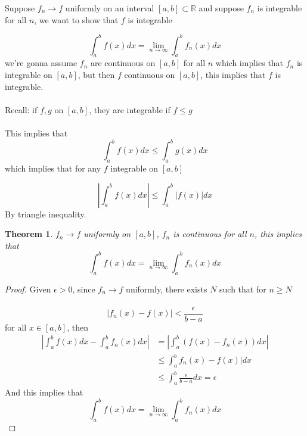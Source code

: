\documentclass[12pt]{article}
\theoremstyle{plain}
\newtheorem{theorem}{Theorem}[section]
\theoremstyle{definition}
\begin{document}
Suppose $f_n \to f$ uniformly on an interval $[a,b]\subset\mathbb{R}$ and suppose $f_n$ is integrable for all $n$, we want to show that $f$ is integrable

$$\int^b_a f(x) dx = \lim_{n\to\infty} \int^b_a f_n (x) dx$$
we're gonna assume $f_n$ are continuous on $[a,b]$ for all $n$ which implies that $f_n$ is integrable on $[a,b]$, but then $f$ continuous on $[a,b]$, this implies that $f$ is integrable.
\\
\\
Recall: if $f,g$ on $[a,b]$, they are integrable if $f \leq g$\\
\\
This implies that
$$\int^b_a f(x) dx \leq \int^b_a g(x) dx$$
which implies that for any $f$ integrable on $[a,b]$

$$|\int^b_a f(x) dx| \leq \int^b_a |f(x)| dx$$
By triangle inequality.

\begin{theorem}
	$f_n \to f$ uniformly on $[a,b]$, $f_n$ is continuous for all $n$, this implies that
	$$\int^b_a f(x) dx = \lim_{n\to\infty} \int^b_a f_n (x) dx$$
\end{theorem}

\begin{proof}
	Given $\epsilon > 0$, since $f_n \to f$ uniformly, there exists $N$ such that for $n \geq N$\\
	\\
	$$|f_n (x) - f(x)| < \frac{\epsilon}{b-a}$$
	for all $x\in [a,b]$, then
	\begin{align*}
		|\int^b_a f(x) dx - \int^b_a f_n(x) dx| &= |\int^b_a (f(x)-f_n (x)) dx|\\
		 &\leq \int^b_a f_n (x) - f(x)|dx\\
		 &\leq \int^b_a \frac{\epsilon}{b-a} dx = \epsilon
	\end{align*}
	And this implies that
	$$\int^b_a f(x) dx = \lim_{n\to\infty} \int^b_a f_n (x) dx$$

\end{proof}
\end{document}

